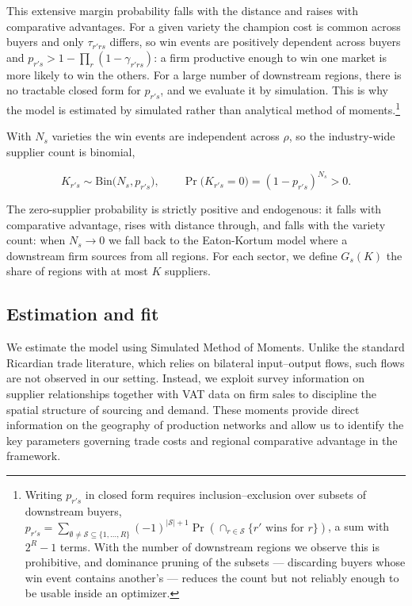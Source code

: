 This extensive margin probability falls with the distance and raises with comparative advantages. For a given variety the champion cost is common across buyers and only $\tau_{r'rs}$ differs, so win events are
positively dependent across buyers and $p_{r's}>1-\prod_{r}(1-\gamma_{r'rs})$: a firm productive enough to win one market is more likely to win the others. For a large number of downstream regions, there is no tractable closed form for $p_{r's}$, and we evaluate it by simulation. This is why the model is estimated by simulated rather than analytical method of moments.\footnote{Writing $p_{r's}$ in closed form requires inclusion--exclusion over subsets of downstream buyers,
$p_{r's}=\sum_{\emptyset\neq\mathcal{S}\subseteq\{1,\dots,R\}}(-1)^{|\mathcal{S}|+1} \Pr(\cap_{r\in\mathcal{S}}\{\text{$r'$ wins for }r\})$, a sum with $2^{R}-1$ terms. With the number of downstream regions we observe this is prohibitive, and dominance pruning of the subsets --- discarding buyers whose win event contains another's --- reduces the count but not reliably enough to be usable inside an optimizer. }

With $N_{s}$ varieties the win events are independent across $\rho$, so the industry-wide supplier count is binomial,

\begin{equation}
K_{r's}\sim\mathrm{Bin}\big(N_{s},p_{r's}\big), \qquad \Pr\big(K_{r's}=0\big)=(1-p_{r's})^{N_{s}}>0 .
\label{eq:binomial}
\end{equation}

The zero-supplier probability is strictly positive and endogenous: it falls with comparative advantage, rises with distance through, and falls with the variety count: when $N_s \rightarrow 0$ we fall back to the Eaton-Kortum model where a downstream firm sources from all regions. For each sector, we define $G_s(K)$ the share of regions with at most $K$ suppliers.




\subsection{Estimation and fit}\label{subsec:estimation_fit}

We estimate the model using Simulated Method of Moments. Unlike the standard Ricardian trade literature, which relies on bilateral input–output flows, such flows are not observed in our setting. Instead, we exploit survey information on supplier relationships together with VAT data on firm sales to discipline the spatial structure of sourcing and demand. These moments provide direct information on the geography of production networks and allow us to identify the key parameters governing trade costs and regional comparative advantage in the \cite{EatonKortum2002} framework.

